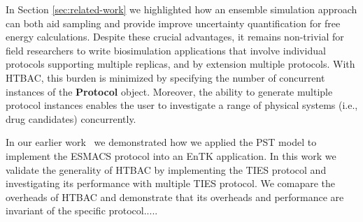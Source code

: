 	In Section \ref{sec:related-work} we highlighted how an ensemble
simulation approach can both aid sampling and provide improve uncertainty
quantification for free energy calculations. Despite these crucial advantages,
it remains non-trivial for field researchers to write biosimulation
applications that involve individual protocols supporting multiple replicas,
and by extension multiple protocols. With HTBAC, this burden is minimized by
specifying the number of concurrent instances of the \textbf{Protocol} object.
Moreover, the ability to generate multiple protocol instances enables the user
to investigate a range of physical systems (i.e., drug candidates)
concurrently.


	In our earlier work~\cite{dakka2017} we demonstrated how we applied the
PST model to implement the ESMACS protocol into an EnTK application. In this
work we validate the generality of HTBAC by implementing the TIES protocol and
investigating its performance with multiple TIES protocol. We comapare the
overheads of HTBAC and demonstrate that its overheads and performance are
invariant of the specific protocol..... 








